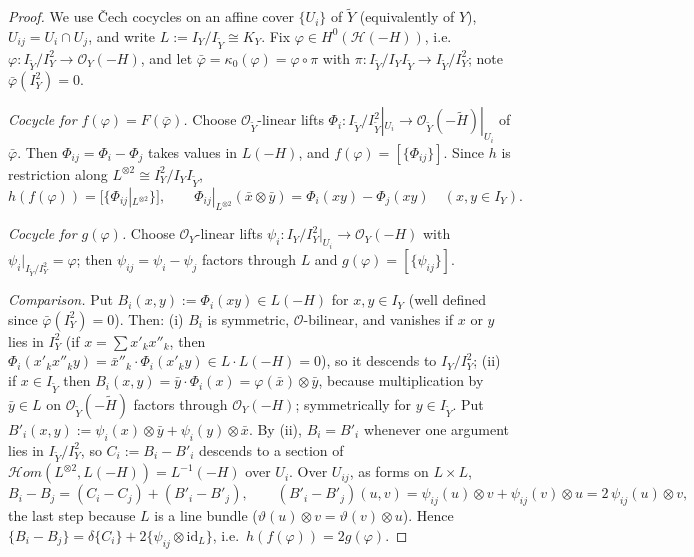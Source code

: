 \documentclass[11pt,reqno]{amsart}
\theoremstyle{plain}
\theoremstyle{definition}
\newcommand{\OO}{\mathcal{O}}
\newcommand{\sHom}{\mathcal{H}om}
\newcommand{\id}{\mathrm{id}}
\newcommand{\Yt}{\widetilde{Y}}
\newcommand{\Ht}{\widetilde{H}}
\newcommand{\Hc}{\mathcal{H}}
\begin{document}
\begin{proof}
We use \v{C}ech cocycles on an affine cover $\{U_i\}$ of $\Yt$ (equivalently of $Y$), $U_{ij}=U_i\cap U_j$, and write $L:=I_Y/I_{\Yt}\cong K_Y$. Fix $\varphi\in H^0(\Hc(-H))$, i.e.\ $\varphi\colon I_{\Yt}/I_Y^2\to\OO_Y(-H)$, and let $\bar\varphi=\kappa_0(\varphi)=\varphi\circ\pi$ with $\pi\colon I_{\Yt}/I_YI_{\Yt}\to I_{\Yt}/I_Y^2$; note $\bar\varphi(I_Y^2)=0$.

\emph{Cocycle for $f(\varphi)=F(\bar\varphi)$.} Choose $\OO_{\Yt}$-linear lifts $\Phi_i\colon I_{\Yt}/I_{\Yt}^2|_{U_i}\to\OO_{\Yt}(-\Ht)|_{U_i}$ of $\bar\varphi$. Then $\Phi_{ij}=\Phi_i-\Phi_j$ takes values in $L(-H)$, and $f(\varphi)=[\{\Phi_{ij}\}]$. Since $h$ is restriction along $L^{\otimes2}\cong I_Y^2/I_YI_{\Yt}$,
\[
h(f(\varphi))=\big[\{\Phi_{ij}|_{L^{\otimes 2}}\}\big],\qquad \Phi_{ij}|_{L^{\otimes2}}(\bar x\otimes\bar y)=\Phi_i(xy)-\Phi_j(xy)\quad(x,y\in I_Y).
\]

\emph{Cocycle for $g(\varphi)$.} Choose $\OO_Y$-linear lifts $\psi_i\colon I_Y/I_Y^2|_{U_i}\to\OO_Y(-H)$ with $\psi_i|_{I_{\Yt}/I_Y^2}=\varphi$; then $\psi_{ij}=\psi_i-\psi_j$ factors through $L$ and $g(\varphi)=[\{\psi_{ij}\}]$.

\emph{Comparison.} Put $B_i(x,y):=\Phi_i(xy)\in L(-H)$ for $x,y\in I_Y$ (well defined since $\bar\varphi(I_Y^2)=0$). Then: (i) $B_i$ is symmetric, $\OO$-bilinear, and vanishes if $x$ or $y$ lies in $I_Y^2$ (if $x=\sum x'_kx''_k$, then $\Phi_i(x'_kx''_ky)=\bar x''_k\cdot\Phi_i(x'_ky)\in L\cdot L(-H)=0$), so it descends to $I_Y/I_Y^2$; (ii) if $x\in I_{\Yt}$ then $B_i(x,y)=\bar y\cdot\Phi_i(x)=\varphi(\bar x)\otimes\bar y$, because multiplication by $\bar y\in L$ on $\OO_{\Yt}(-\Ht)$ factors through $\OO_Y(-H)$; symmetrically for $y\in I_{\Yt}$. Put $B'_i(x,y):=\psi_i(x)\otimes\bar y+\psi_i(y)\otimes\bar x$. By (ii), $B_i=B'_i$ whenever one argument lies in $I_{\Yt}/I_Y^2$, so $C_i:=B_i-B'_i$ descends to a section of $\sHom(L^{\otimes2},L(-H))=L^{-1}(-H)$ over $U_i$. Over $U_{ij}$, as forms on $L\times L$,
\[
B_i-B_j=(C_i-C_j)+(B'_i-B'_j),\qquad (B'_i-B'_j)(u,v)=\psi_{ij}(u)\otimes v+\psi_{ij}(v)\otimes u=2\,\psi_{ij}(u)\otimes v,
\]
the last step because $L$ is a line bundle ($\vartheta(u)\otimes v=\vartheta(v)\otimes u$). Hence $\{B_i-B_j\}=\delta\{C_i\}+2\{\psi_{ij}\otimes\id_L\}$, i.e.\ $h(f(\varphi))=2g(\varphi)$.
\end{proof}
\end{document}

